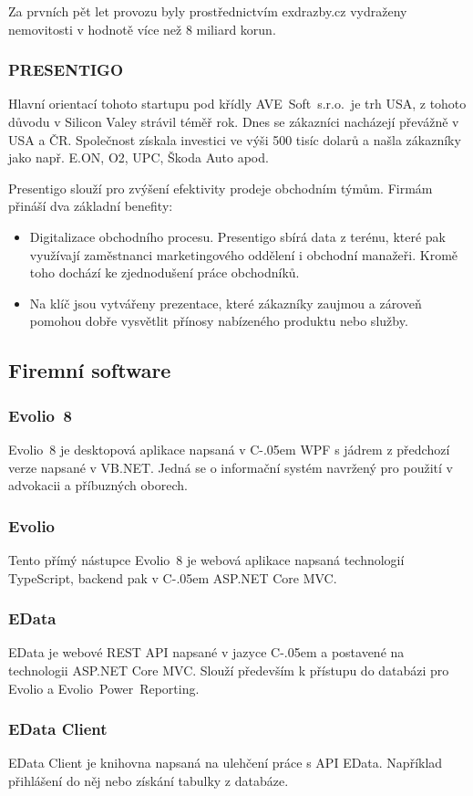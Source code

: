 \documentclass[czech,bachelorpractice,dept460,male,csharp]{diploma}
\newcommand{\AveSoft}{AVE~Soft~s.r.o.}
\newcommand{\EvolioEight}{Evolio~8}
\newcommand{\EFilters}{Evolio~Power~Reporting}
\newcommand{\EvolioX}{Evolio}
\newcommand{\EData}{EData}
\newcommand{\Csharp}{%
  {\settoheight{\dimen0}{C}C\kern-.05em \resizebox{!}{\dimen0}{\raisebox{\depth}{\#}}}}
\begin{document}
		Za prvních pět let provozu byly prostřednictvím exdrazby.cz vydraženy nemovitosti v hodnotě více než 8 miliard korun.
 		\subsubsection{PRESENTIGO}
 		Hlavní orientací tohoto startupu pod křídly \AveSoft\ je trh USA, z tohoto důvodu v Silicon Valey strávil téměř rok. Dnes se zákazníci nacházejí převážně v USA a ČR. Společnost získala investici ve výši 500 tisíc dolarů a našla zákazníky jako např. E.ON, O2, UPC, Škoda Auto apod.

		Presentigo slouží pro zvýšení efektivity prodeje obchodním týmům. Firmám přináší dva základní benefity:
		\begin{itemize}
			\item
			Digitalizace obchodního procesu. Presentigo sbírá data z terénu, které pak využívají zaměstnanci marketingového oddělení i obchodní manažeři. Kromě toho dochází ke zjednodušení práce obchodníků.
			\item
			Na klíč jsou vytvářeny prezentace, které zákazníky zaujmou a zároveň pomohou dobře vysvětlit přínosy nabízeného produktu nebo služby.
		\end{itemize}
	\subsection{Firemní software}
		\subsubsection{\EvolioEight}
		{\EvolioEight} je desktopová aplikace napsaná v {\Csharp} WPF s jádrem z předchozí verze napsané v VB.NET. Jedná se o informační systém navržený pro použití v advokacii a příbuzných oborech. 
		\subsubsection{\EvolioX}
		Tento přímý nástupce {\EvolioEight} je webová aplikace napsaná technologií TypeScript, backend pak v {\Csharp} ASP.NET Core MVC.
		\subsubsection{\EData}
		{\EData} je webové REST API napsané v jazyce {\Csharp} a postavené na technologii ASP.NET Core MVC.
		Slouží především k přístupu do databázi pro {\EvolioX} a {\EFilters}.
		\subsubsection{EData Client}
		EData Client je knihovna napsaná na ulehčení práce s API {\EData}. Například přihlášení do něj nebo získání tabulky z databáze. 
\end{document}
